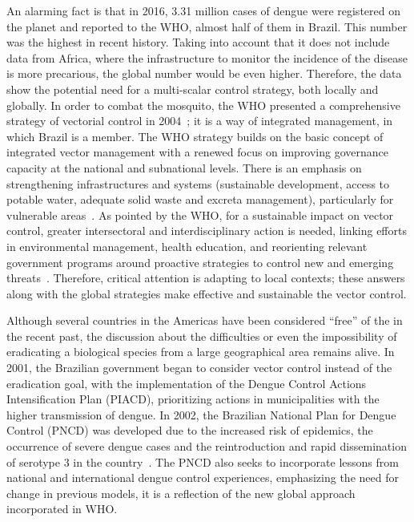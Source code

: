 An alarming fact is that in 2016, 3.31 million cases of dengue were registered on the planet and reported to the WHO, almost half of them in Brazil.
This number was the highest in recent history.
Taking into account that it does not include data from Africa, where the infrastructure to monitor the incidence of the disease is more precarious, the global number would be even higher.
Therefore, the data show the potential need for a multi-scalar \Aedes control strategy, both locally and globally.
In order to combat the mosquito, the WHO presented a comprehensive strategy of vectorial control in 2004~\cite{world2004global}; it is a way of integrated management, in which Brazil is a member.
%
The WHO strategy builds on the basic concept of integrated vector management with a renewed focus on improving governance capacity at the national and subnational levels.
There is an emphasis on strengthening infrastructures and systems (\eg sustainable development, access to potable water, adequate solid waste and excreta management), particularly for vulnerable areas~\cite{world2012global}.
As pointed by the WHO, for a sustainable impact on vector control, greater intersectoral and interdisciplinary action is needed, linking efforts in environmental management, health education, and reorienting relevant government programs around proactive strategies to control new and emerging threats~\cite{world2012global}.
Therefore, critical attention is adapting to local contexts; these answers along with the global strategies make effective and sustainable the vector control.

Although several countries in the Americas have been considered “free” of the \Aedes in the recent past, the discussion about the difficulties or even the impossibility of eradicating a biological species from a large geographical area remains alive.
In 2001, the Brazilian government began to consider vector control instead of the eradication goal, with the implementation of the Dengue Control Actions Intensification Plan (PIACD), prioritizing actions in municipalities with the higher transmission of dengue. In 2002, the Brazilian National Plan for Dengue Control (PNCD) was developed due to the increased risk of epidemics, the occurrence of severe dengue cases and the reintroduction and rapid dissemination of serotype 3 in the country~\cite{web:pncdbrasil}.
The PNCD also seeks to incorporate lessons from national and international dengue control experiences, emphasizing the need for change in previous models, \ie it is a reflection of the new global approach incorporated in WHO.


